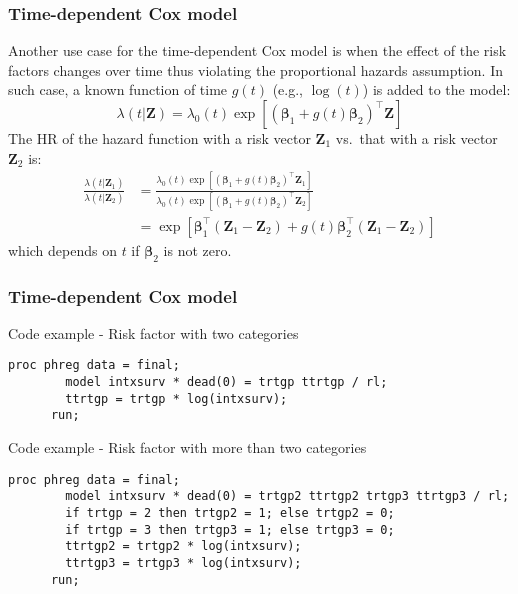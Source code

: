 \documentclass[11pt, aspectratio = 169]{beamer}
\begin{document}
\begin{frame}[fragile]
  \frametitle{Time-dependent Cox model}
  Another use case for the time-dependent Cox model is when the effect of the risk factors changes over time \alert{thus violating the proportional hazards assumption}. In such case, a known function of time $g(t)$ (e.g., $\log(t)$) is added to the model\footnotemark:
  \begin{equation*}
    \lambda\left(t|\mathbf{Z}\right) = \lambda_{0}(t)\exp\left[\left(\boldsymbol{\beta}_1 + g(t)\boldsymbol{\beta}_2\right)^\top\mathbf{Z}\right]
  \end{equation*}
  The HR of the hazard function with a risk vector $\mathbf{Z}_1$ vs.\ that with a risk vector $\mathbf{Z}_2$ is:
  \begin{equation*}
    \begin{split}
      \frac{\lambda\left(t|\mathbf{Z}_1\right)}{\lambda\left(t|\mathbf{Z}_2\right)} & = \frac{\lambda_0(t)\exp\left[\left(\boldsymbol{\beta}_1 + g(t)\boldsymbol{\beta}_2\right)^\top\mathbf{Z}_1\right]}{\lambda_0(t)\exp\left[\left(\boldsymbol{\beta}_1 + g(t)\boldsymbol{\beta}_2\right)^\top\mathbf{Z}_2\right]} \\
      & = \exp\left[\boldsymbol{\beta}_1^\top\left(\mathbf{Z}_1 - \mathbf{Z}_2\right) + g(t)\boldsymbol{\beta}_2^\top\left(\mathbf{Z}_1 - \mathbf{Z}_2\right)\right]
    \end{split}
  \end{equation*}
  which depends on $t$ if $\boldsymbol{\beta}_2$ is not zero.
\end{frame}

\begin{frame}[fragile]
  \frametitle{Time-dependent Cox model}
  \begin{block}{Code example - Risk factor with two categories}
    \begin{lstlisting}[gobble = 6]
      proc phreg data = final;
        model intxsurv * dead(0) = trtgp ttrtgp / rl;
        ttrtgp = trtgp * log(intxsurv);
      run;
    \end{lstlisting}
  \end{block}

  \begin{block}{Code example - Risk factor with more than two categories}
    \begin{lstlisting}[gobble = 6]
      proc phreg data = final;
        model intxsurv * dead(0) = trtgp2 ttrtgp2 trtgp3 ttrtgp3 / rl;
        if trtgp = 2 then trtgp2 = 1; else trtgp2 = 0;
        if trtgp = 3 then trtgp3 = 1; else trtgp3 = 0;
        ttrtgp2 = trtgp2 * log(intxsurv);
        ttrtgp3 = trtgp3 * log(intxsurv);        
      run;
    \end{lstlisting}
  \end{block}
\end{frame}
\end{document}
